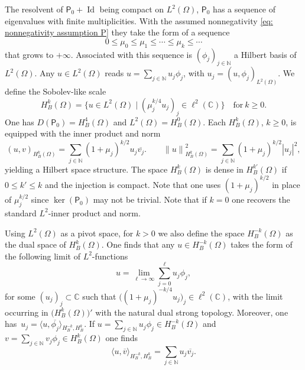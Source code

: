 \documentclass[JEP,XML,SOM,Unicode,published]{cedram}
\let\sep\mid
\theoremstyle{plain}
\theoremstyle{definition}
\def\C{\mathbb{C}}
\def\N{\mathbb{N}}
\newcommand{\ovl}[1]{\overline{#1}}
\newcommand{\inp}[2]{(#1, #2)}
\newcommand{\dup}[2]{\langle #1 , #2 \rangle}
\newcommand{\Norm}[2]{{\| #1 \|}_{#2}}
\newcommand{\Pell}{\mathsf P_0}
\DeclareMathOperator{\id}{Id}
\begin{document}
The resolvent of $\Pell +\id$ being compact on $L^2(\Omega)$, $\Pell$ has a sequence of
eigenvalues with finite multiplicities. With the assumed nonnegativity
\eqref{eq: nonnegativity assumption P} they take the form of a sequence
\begin{equation*}
0\leq \mu_0 \leq \mu_1 \leq \cdots \leq \mu_k \leq \cdots
\end{equation*}
that grows to $+\infty$. Associated with this sequence is
$(\phi_j)_{j \in \N}$ a Hilbert basis of $L^2(\Omega)$.
Any $u \in L^2(\Omega)$ reads $u = \sum_{j \in \N} u_j \phi_j$, with
$u_j = \inp{u}{\phi_j}_{L^2(\Omega)}$.
We define the Sobolev-like scale
\begin{equation}
\label{eq: Sobolev scale}
H^k_B (\Omega)= \{ u \in L^2(\Omega)\sep (\mu_j^{k/4} u_j)_j \in \ell^2(\C)\}
\quad \text{for} \ k\geq 0.
\end{equation}
One has $D(\Pell) = H^4_B (\Omega)$ and $L^2(\Omega) = H^0_B(\Omega)$. Each $H^k_B (\Omega)$, $k \geq 0$, is equipped with
the inner product and norm
\begin{equation*}
\inp{u}{ v}_{H^k_B (\Omega)}
= \sum_{j \in \N} (1 + \mu_j)^{k/2} u_j \ovl{v_j}.
\qquad \Norm{u}{H^k_B (\Omega)}^2 = \sum_{j \in \N} (1 + \mu_j)^{k/2} |u_j|^2,
\end{equation*}
yielding a Hilbert space structure.
The space $H^k_B (\Omega)$ is dense in $H^{k'}_B (\Omega)$ if $0\leq
k' \leq k$ and the injection is compact.
Note that one uses $(1 + \mu_j)^{k/2}$ in place of $\mu_j^{k/2}$ since
$\ker(\Pell)$ may not be trivial. Note that if $k=0$ one recovers the
standard $L^2$-inner product and norm.

Using $L^2(\Omega)$ as a pivot space, for $k >0$ we also define the space
$H^{-k}_B(\Omega)$ as the dual space of $H^k_B(\Omega)$. One
finds that any $u \in H^{-k}_B(\Omega)$ takes the form of the
following limit of $L^2$-functions
\begin{equation*}
u = \lim_{\ell \to \infty} \sum_{j=0}^\ell u_j \phi_j,
\end{equation*}
for some $(u_j)_j \!\subset\! \C$ such that $\big((1 + \mu_j)^{-k/4} u_j\big)_j \!\in\!\ell^2(\C)$, with the limit \hbox{occurring} in
$\big(H^k_B(\Omega)\big)'$ with the natural dual strong topology. Moreover, one has~\hbox{$u_j \!=\!\dup{u}{\ovl{\phi_j}}\!_{H^{-k}_B, H^{k}_B}$}.
If $u = \sum_{j \in \N} u_j \phi_j \in H^{-k}_B(\Omega)$ and $v =
\sum_{j \in \N} v_j \phi_j \in H^{k}_B(\Omega)$ one finds
\begin{equation*}
\dup{u}{\ovl{v}}_{H^{-k}_B, H^{k}_B} = \sum_{j \in \N} u_j \ovl{v_j}.
\end{equation*}
\end{document}
